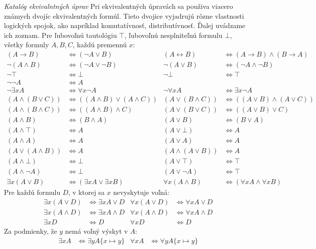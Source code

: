 \emph{Katalóg ekvivalntných úprav}
Pri ekvivalentných úpravách sa použiva viacero známych dvojíc ekvivalentných formúl. Tieto dvojice vyjadrujú rôzne vlastnosti logických spojok, ako napríklad komutatívnosť, distributívnosť. Ďalej uvádzame ich zoznam.
Pre ľubovoľnú tautológiu $\top$, ľubovoľnú nesplniteľnú formulu $\bot$, všetky formuly $A, B, C$, každú premennú $x$:
\begin{align}
(A \to B) &\Leftrightarrow (\neg A \lor B)	&	(A \leftrightarrow B) &\Leftrightarrow (A \to B) \land (B \to A) \label{upravy:1} \\
\neg(A \land B) &\Leftrightarrow (\neg A \lor \neg B)	&	\neg(A \lor B) &\Leftrightarrow (\neg A \land \neg B)\label{upravy:2}\\
\neg\top &\Leftrightarrow \bot 			&	\neg\bot &\Leftrightarrow \top\\
\neg\neg A &\Leftrightarrow A\\
\neg \exists x A &\Leftrightarrow \forall x \neg A 		&	\neg \forall x A &\Leftrightarrow \exists x \neg A\label{upravy:5}\\
(A \land (B \lor C)) &\Leftrightarrow ((A \land B) \lor (A \land C))&(A \lor (B \land C)) &\Leftrightarrow ((A \lor B) \land (A \lor C))\\
(A \land (B \land C)) &\Leftrightarrow ((A \land B) \land C)&(A \lor (B \lor C)) &\Leftrightarrow ((A \lor B) \lor C)\label{upravy:7}\\
(A \land B) &\Leftrightarrow (B \land A)	&	(A \lor B) &\Leftrightarrow (B \lor A)\label{upravy:8}\\
(A \land \top) &\Leftrightarrow A 		&	(A \lor \bot)& \Leftrightarrow A\label{upravy:9}\\
(A \land A) &\Leftrightarrow A 			&	(A \lor A) &\Leftrightarrow A\\
(A \lor (A \land B)) &\Leftrightarrow A 		&	(A \land (A \lor B)) &\Leftrightarrow A\\
(A \land \bot) &\Leftrightarrow \bot 		&	(A \lor \top) &\Leftrightarrow \top\\
(A \land \neg A) &\Leftrightarrow \bot 		&	(A \lor \neg A) &\Leftrightarrow \top\\
\exists x(A \lor B) &\Leftrightarrow (\exists x A \lor \exists x B)	&	\forall x (A \land B) &\Leftrightarrow (\forall x A \land \forall x B)\label{upravy:14}
\end{align}
Pre každú formulu $D$, v ktorej sa $x$ nevyskytuje voľná:
\begin{align}
\exists x(A \lor D) &\Leftrightarrow \exists x A \lor D 	&	\forall x (A \lor D) &\Leftrightarrow \forall x A \lor D\\
\exists x (A \land D) &\Leftrightarrow \exists x A \land D 	&	\forall x (A \land D) &\Leftrightarrow \forall x A \land D\\
\exists x D &\Leftrightarrow D 					&	\forall x D &\Leftrightarrow D\label{upravy:17}
\end{align}
Za podmienky, že $y$ nemá voľný výskyt v $A$:
\begin{align}
\exists x A &\Leftrightarrow \exists y A\{x \mapsto y\}	&	\forall x A &\Leftrightarrow \forall y A\{x \mapsto y\} \label{upravy:18}
\end{align}

